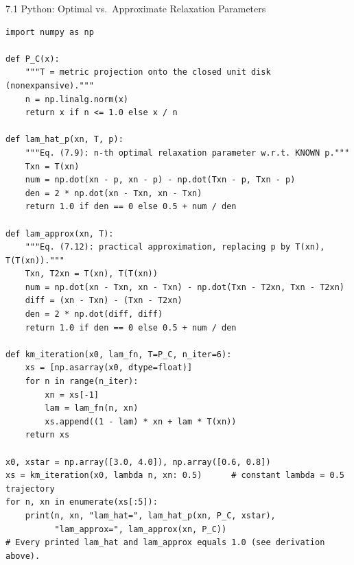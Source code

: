 \documentclass[aspectratio=169,10pt]{beamer}
\begin{document}
\begin{frame}[fragile]{7.1 Python: Optimal vs.\ Approximate Relaxation Parameters}
\begin{lstlisting}[caption={Formulas (7.9) and (7.12) on the running example}]
import numpy as np

def P_C(x):
    """T = metric projection onto the closed unit disk (nonexpansive)."""
    n = np.linalg.norm(x)
    return x if n <= 1.0 else x / n

def lam_hat_p(xn, T, p):
    """Eq. (7.9): n-th optimal relaxation parameter w.r.t. KNOWN p."""
    Txn = T(xn)
    num = np.dot(xn - p, xn - p) - np.dot(Txn - p, Txn - p)
    den = 2 * np.dot(xn - Txn, xn - Txn)
    return 1.0 if den == 0 else 0.5 + num / den

def lam_approx(xn, T):
    """Eq. (7.12): practical approximation, replacing p by T(xn), T(T(xn))."""
    Txn, T2xn = T(xn), T(T(xn))
    num = np.dot(xn - Txn, xn - Txn) - np.dot(Txn - T2xn, Txn - T2xn)
    diff = (xn - Txn) - (Txn - T2xn)
    den = 2 * np.dot(diff, diff)
    return 1.0 if den == 0 else 0.5 + num / den

def km_iteration(x0, lam_fn, T=P_C, n_iter=6):
    xs = [np.asarray(x0, dtype=float)]
    for n in range(n_iter):
        xn = xs[-1]
        lam = lam_fn(n, xn)
        xs.append((1 - lam) * xn + lam * T(xn))
    return xs

x0, xstar = np.array([3.0, 4.0]), np.array([0.6, 0.8])
xs = km_iteration(x0, lambda n, xn: 0.5)      # constant lambda = 0.5 trajectory
for n, xn in enumerate(xs[:5]):
    print(n, xn, "lam_hat=", lam_hat_p(xn, P_C, xstar),
          "lam_approx=", lam_approx(xn, P_C))
# Every printed lam_hat and lam_approx equals 1.0 (see derivation above).
\end{lstlisting}
\end{frame}
\end{document}
